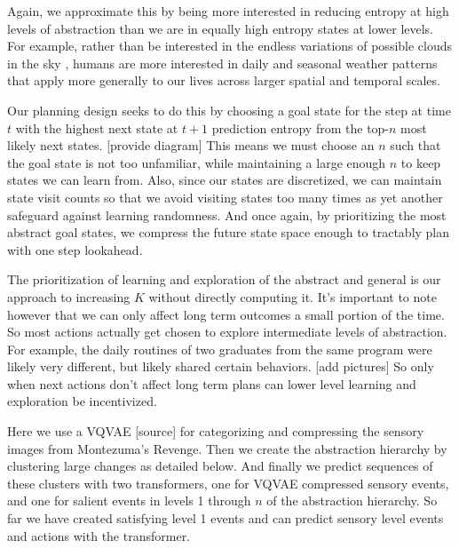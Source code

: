 \documentclass{article}
\begin{document}
Again, we approximate this by being more interested in reducing entropy at high levels of abstraction than we are in equally high entropy states at lower levels. For example, rather than be interested in the endless variations of
possible clouds in the sky \cite{alex-graves-vid},
humans are more interested in daily and seasonal weather patterns that apply more generally to our lives across larger spatial and temporal scales.

Our planning design seeks to do this by choosing a goal state for the step at time $t$ with the highest next state at $t + 1$ prediction entropy from the top-$n$ most likely next states. [provide diagram] This means we must choose an $n$ such that the goal state is not too unfamiliar, while maintaining a large enough $n$ to keep states we can learn from. Also, since our states are discretized, we can maintain state visit counts so that we avoid visiting states too many times as yet another safeguard against learning randomness. And once again, by prioritizing the most abstract goal states, we compress the future state space enough to tractably plan with one step lookahead.


\hspace{0pt}




The prioritization of learning and exploration of the abstract and general is our approach to increasing $K$ without directly computing it. It's important to note however that we can only affect long term outcomes a small portion of the time. So most actions actually get chosen to explore intermediate levels of abstraction. For example, the daily routines of two graduates from the same program were likely very different, but likely shared certain behaviors. [add pictures] So only when next actions don't affect long term plans can lower level learning and exploration be incentivized.

Here we use a VQVAE [source] for categorizing and compressing the sensory images from Montezuma's Revenge. Then we create the abstraction hierarchy by clustering large changes as detailed below. And finally we predict sequences of these clusters with two transformers, one for VQVAE compressed sensory events, and one for salient events in levels 1 through $n$ of the abstraction hierarchy. So far we have created satisfying level 1 events and can predict sensory level events and actions with the transformer.
\end{document}
